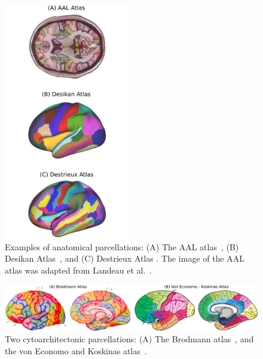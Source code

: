 \begin{figure}[t!]
    \includegraphics[width=0.49\textwidth]{4.brain_parcellation/img/anatomical.png}
    \caption{Examples of anatomical parcellations: (A) The AAL atlas~\cite{Landeau2002},
    (B) Desikan Atlas~\cite{Desikan2006}, and (C) Destrieux Atlas \cite{Destrieux2010}.
    The image of the AAL atlas was adapted from Landeau et al.~\cite{Landeau2002}.}
    \label{fig:brain_function}
\end{figure}

\begin{figure}[t!]
    \includegraphics[width=\textwidth]{4.brain_parcellation/img/cytoarchitectonic.png}
    \caption{Two cytoarchitectonic parcellations: (A) The Brodmann atlas~\cite{Brodmann1909},
             and the von Economo and Koskinas atlas~\cite{VonEconomo1925}.}
    \label{fig:brain_function}
\end{figure}



